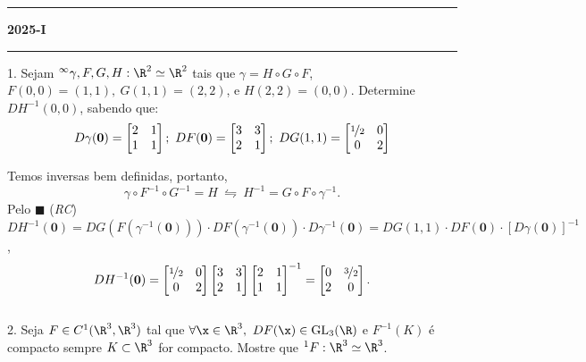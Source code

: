 \-\vspace{-0.3cm} 
  {\hrule \vspace{-0.15cm}
  \centering \textbf{2025-I} \vspace{0.1cm}
  \hrule}

1. Sejam \(^\infty\gamma, F, G, H : \R^2 \simeq \R^2\) tais que \(\gamma = H \circ G \circ F\), \(F(0,0)= (1,1), \ G(1,1) = (2,2)\), e \(H(2,2) = (0,0)\). Determine \(DH^{-1}(0,0)\), sabendo que: 
{\small\[D\gamma(\textbf{0}) = \begin{bmatrix}
    2 & 1 \\ 
    1 &1 
\end{bmatrix}; \ DF(\textbf{0}) = \begin{bmatrix}
    3 & 3 \\ 
    2 &1 
\end{bmatrix}; \ DG(1,1) = \begin{bmatrix}
    \nicefrac{1}{2} & 0 \\ 
    0 & 2 
\end{bmatrix}\]  }
\par\noindent 
\textcolor{gris}{Temos inversas bem definidas, portanto,%
\[\gamma \circ F^{-1} \circ G^{-1} = H \ \leftrightharpoons\ H^{-1} = G \circ F\circ \gamma^{-1}.\]
Pelo \(\blacksquare\) (\emph{RC}) \(DH^{-1}(\textbf{0})= DG(F(\gamma^{-1}(\textbf{0}))) \cdot DF(\gamma^{-1}(\textbf{0})) \cdot D\gamma^{-1}(\textbf{0}) = DG(1,1)\cdot DF(\textbf{0}) \cdot [D\gamma(\textbf{0})]^{-1}\), 
{\small\[DH^{-1}(\textbf{0}) = \begin{bmatrix}
    \nicefrac{1}{2} & 0 \\ 
    0 & 2
\end{bmatrix}\begin{bmatrix}
    3 & 3 \\ 
    2 &1 
\end{bmatrix}\begin{bmatrix}
     2 & 1 \\ 
    1 &1 
\end{bmatrix}^{-1} = \begin{bmatrix}
0 & \nicefrac{3}{2} \\
2 & 0 
\end{bmatrix}.\]  }
} \\ 
2. Seja \(F\in C^1(\R^3, \R^3) \) tal que \(\forall \x \in \R^3,\ DF(\x)\in \operatorname{GL}_3(\R)\) e \(F^{-1}(K)\) é compacto sempre \(K\subset \R^3 \) for compacto. Mostre que \(^1F: \R^3 \simeq \R^3\).  \\ 
